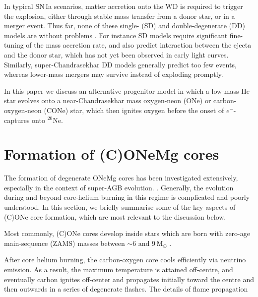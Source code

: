 \documentclass[twocolumn,tighten,times]{aastex62}
\newcommand{\ia}{SN\,Ia\xspace}
\newcommand\one{(C)ON\lowercase{e}M\lowercase{g}\xspace}
\begin{document}
 In  typical \ia scenarios, matter accretion onto the WD is required to trigger the explosion, 
 either through stable mass transfer from a donor star,  or in a merger event.  
Thus far, none of these single- (SD) and double-degenerate (DD) models 
are without problems \citep{vanKerkwijk:2010he}. For instance SD models require significant 
fine-tuning of the mass accretion rate, and also predict 
interaction between the ejecta and the donor star, which has not yet 
been observed in early light curves. 
Similarly, super-Chandrasekhar DD models generally 
predict too few events, whereas lower-mass mergers may survive instead of exploding promptly. 

In this paper we discuss an alternative progenitor model
in which a low-mass He star evolves onto a near-Chandrasekhar mass 
oxygen-neon (ONe) or carbon-oxygen-neon (CONe) star, 
which then ignites oxygen before the onset of $e^{-}$-captures onto $^{20}$Ne.

 


\section{Formation of \one cores}\label{sec:2}
The formation of degenerate ONeMg cores has been investigated extensively, 
especially in the context of super-AGB evolution. 
\citep[for recent results see][]{Chen:2014,Denissenkov:2013qaa,Schwab:2015bma,Lecoanet:2016,Meyer:2017elq,Woosley:2019sdf}.
Generally, the evolution during and beyond core-helium burning in this regime is complicated and poorly understood. In this section, we briefly summarise some of the key aspects of (C)ONe core formation, which are most relevant to the discussion below. 

Most commonly, (C)ONe cores develop inside stars which are born with zero-age 
main-sequence (ZAMS) masses between $\sim 6$ and 9\,M$_{\odot}$ \citep{Farmer:2015afs}.

After core helium burning, the carbon-oxygen core cools efficiently via neutrino emission. 
As a result, the maximum temperature is attained off-centre, and eventually 
carbon ignites off-center and propagates initially toward the centre and then outwards 
in a series of degenerate flashes. The details of flame propagation 
\end{document}
